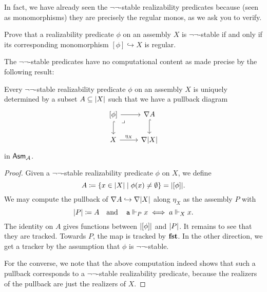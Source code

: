 In fact, we have already seen the \(\lnot\lnot\)-stable realizability predicates
because (seen as monomorphisms) they are precisely the regular monos, as we ask you
to verify.

\begin{exercise}\label{exer:double-negation-stable-iff-regular-mono}
  Prove that a realizability predicate \(\phi\) on an assembly \(X\) is
  \(\lnot\lnot\)-stable if and only if its corresponding monomorphism
  \([\phi] \hookrightarrow X\) is regular.
\end{exercise}

The \(\lnot\lnot\)-stable predicates have no computational content as made
precise by the following result:

\begin{proposition}\label{not-not-stable-ordinary-subsets}
  Every \(\lnot\lnot\)-stable realizability predicate \(\phi\) on an
  assembly \(X\) is uniquely determined by a subset \(A \subseteq \lvert X\rvert\)
  such that we have a pullback diagram
  \[
    \begin{tikzcd}
      {[\phi]} \ar[r] \ar[d,hookrightarrow] \pbcorner
      & \nabla A \ar[d,hookrightarrow] \\
      X \ar[r,"\eta_X"] & \nabla\carrier{X}
    \end{tikzcd}
  \]
  in \(\mathsf{Asm}_{\mathcal A}\).%
\end{proposition}
\begin{proof}
  Given a \(\lnot\lnot\)-stable realizability predicate \(\phi\) on \(X\), we
  define
  \[
    A \coloneqq \{x \in \lvert X\rvert \mid \phi(x) \neq \emptyset\} = \lvert[\phi]\rvert.
  \]
  We may compute the pullback of \(\nabla A \hookrightarrow \nabla\lvert X\rvert\)
  along \(\eta_X\) as the assembly \(P\) with
  \[
    \lvert P\rvert \coloneqq A \quad\text{and}\quad
    \operatorname{\mathtt{a}} \Vdash_P x \iff a \Vdash_X x.
  \]
  The identity on \(A\) gives functions between \(\lvert[\phi]\rvert\) and
  \(\lvert P\rvert\). It remains to see that they are tracked.
  Towards \(P\), the map is tracked by \(\operatorname{\mathbf{fst}}\). In the other direction, we
  get a tracker by the assumption that \(\phi\) is \(\lnot\lnot\)-stable.

  For the converse, we note that the above computation indeed shows that such a
  pullback corresponds to a \(\lnot\lnot\)-stable realizability predicate,
  because the realizers of the pullback are just the realizers of \(X\).
\end{proof}


